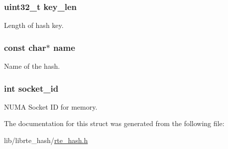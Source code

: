 \subsubsection[{key\+\_\+len}]{\setlength{\rightskip}{0pt plus 5cm}uint32\+\_\+t key\+\_\+len}\label{structrte__hash__parameters_a7250588fe859c80e349c79c2b15ee421}
Length of hash key. \hypertarget{structrte__hash__parameters_a8f8f80d37794cde9472343e4487ba3eb}{}
\subsubsection[{name}]{\setlength{\rightskip}{0pt plus 5cm}const char$\ast$ name}\label{structrte__hash__parameters_a8f8f80d37794cde9472343e4487ba3eb}
Name of the hash. \hypertarget{structrte__hash__parameters_a229cb0bd24215f0cb940e0724dbd4d55}{}
\subsubsection[{socket\+\_\+id}]{\setlength{\rightskip}{0pt plus 5cm}int socket\+\_\+id}\label{structrte__hash__parameters_a229cb0bd24215f0cb940e0724dbd4d55}
N\+U\+M\+A Socket I\+D for memory. 

The documentation for this struct was generated from the following file\+:\begin{DoxyCompactItemize}
\item 
lib/librte\+\_\+hash/\hyperlink{rte__hash_8h}{rte\+\_\+hash.\+h}\end{DoxyCompactItemize}

